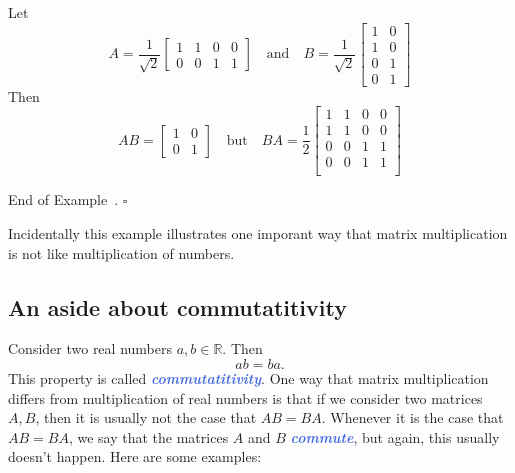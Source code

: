 \documentclass[10pt]{article}
\newcommand{\demph}[1]{\textcolor{RoyalBlue}{\textbf{\slshape #1}}} %
\theoremstyle{definition}
\newtheorem{example}[theorem]{Example}
\renewenvironment{example}
{\begin{oldexample}}
  {\par\smallskip\hfill   End of Example~\theexample. $\square$    \par\end{oldexample}}
\newcommand{\R}{\mathbb{R}}           %
\begin{document}
\begin{example}
  Let
  \begin{equation*}
    A=\frac{1}{\sqrt{2}}\begin{bmatrix}
      1 & 1& 0 & 0\\
      0&0&1&1
    \end{bmatrix}
    \quad \text{and} \quad
    B=
    \frac{1}{\sqrt{2}}
    \begin{bmatrix}
      1 & 0\\
      1 & 0\\
      0&1\\
      0&1
    \end{bmatrix}
  \end{equation*}
  Then
  \begin{equation*}
    AB =
    \begin{bmatrix}
      1&0\\
      0&1
    \end{bmatrix}
    \quad \text{but} \quad 
    BA =
    \frac{1}{2}\begin{bmatrix}
      1&1&0&0\\
      1&1&0&0\\
      0&0&1&1\\
      0&0&1&1\\
    \end{bmatrix}
  \end{equation*}
\end{example}
Incidentally this example illustrates one imporant way that matrix multiplication is not like
multiplication of numbers.

\subsection{An aside about commutatitivity}
Consider two real numbers $a,b\in \R$. Then
\begin{equation*}
  ab = ba.
\end{equation*}
This property is called \demph{commutatitivity}. One way that matrix
multiplication differs from multiplication of real numbers is that if we
consider two matrices $A,B$, then it is usually not the case that $AB=BA$.
Whenever it is the case that $AB=BA$, we say that the matrices $A$ and $B$
\demph{commute}, but again, this usually doesn't happen. Here are some
examples:
\end{document}
